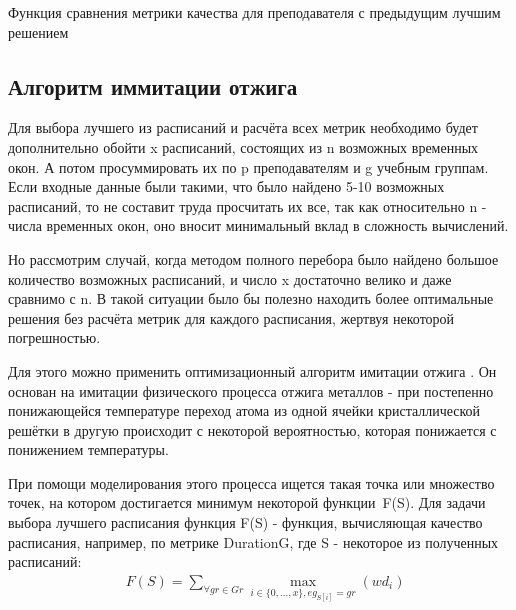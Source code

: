 \begin{algorithm} 
	\nonl{}
	\caption{Функция сравнения метрики качества для преподавателя с предыдущим лучшим решением}	
	\label{alg:algoW}
\end{algorithm} 
\FloatBarrier

\subsection{Алгоритм иммитации отжига}
Для выбора лучшего из расписаний и расчёта всех метрик необходимо будет дополнительно обойти x расписаний, состоящих из n возможных временных окон. А потом просуммировать их по p преподавателям и g учебным группам. 
Если входные данные были такими, что было найдено 5-10 возможных расписаний, то не составит труда просчитать их все, так как относительно n - числа временных окон, оно вносит минимальный вклад в сложность вычислений.

Но рассмотрим случай, когда методом полного перебора было найдено большое количество возможных расписаний, и число x достаточно велико и даже сравнимо с n. В такой ситуации было бы полезно находить более оптимальные решения без расчёта метрик для каждого расписания, жертвуя некоторой погрешностью.

Для этого можно применить оптимизационный алгоритм имитации отжига \cite{sim}. Он основан на имитации физического процесса отжига металлов - при постепенно понижающейся температуре переход атома из одной ячейки кристаллической решётки в другую происходит с некоторой вероятностью, которая понижается с понижением температуры.

При помощи моделирования этого процесса ищется такая точка или множество точек, на котором достигается минимум некоторой функции F(S). Для задачи выбора лучшего расписания функция F(S) - функция, вычисляющая качество расписания, например, по метрике DurationG, где S - некоторое из полученных расписаний:
\begin{align}
	& {F(S)} =  \sum\limits_{\forall  gr \in Gr}\max\limits_{i \in \{0,...,x\}, eg_{S[i]} = gr}(wd_i)
\end{align}

